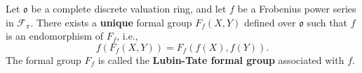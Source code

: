 Let $\mathfrak{o}$ be a complete discrete valuation ring, and let $f$ be a Frobenius power series in $\mathcal{F}_\pi$. There exists a \textbf{unique} formal group $F_f(X,Y)$ defined over $\mathfrak{o}$ such that $f$ is an endomorphism of $F_f$, i.e.,
$$
f(F_f(X,Y)) = F_f(f(X), f(Y)).
$$
The formal group $F_f$ is called the \textbf{Lubin-Tate formal group} associated with $f$.
